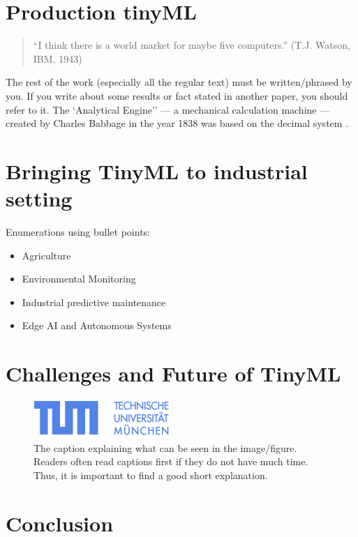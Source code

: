 \documentclass[twocolumn]{article}
\begin{document}
\section{Production tinyML}



\begin{quote}
	``I think there is a world market for maybe five computers.''
	(T.J. Watson, IBM, 1943)
\end{quote}

The rest of the work (especially all the regular text) must be
written/phrased by you. If you write about some results or fact
stated in another paper, you should refer to it.
The `Analytical Engine'' --- a mechanical calculation machine ---
created by Charles Babbage in the year 1838 was based on the decimal
system
\cite{hussein_original_2024, paul_rethinking_2021, de_prado_robustifying_2020,ren_synergy_2021,roshan_adaptive_2021}.


\section{Bringing TinyML to industrial setting}

Enumerations using bullet points:

\begin{itemize}
	\item 	Agriculture
	\item 	Environmental Monitoring
	\item 	Industrial predictive maintenance
	\item 	Edge AI and Autonomous Systems
\end{itemize}


\section{Challenges and Future of TinyML }


\begin{figure}
	\centerline{
	\includegraphics[width=0.9\columnwidth]{resource/TUM-Logo-102.png}
	}
	\caption{The caption explaining what can be seen in the image/figure.
	Readers often read captions first if they do not have much time. Thus,
	it is important to find a good short explanation.}
	\label{TUM}
	\end{figure}

\section{Conclusion}
\label{conclusion}



\nocite{hussein_original_2024,paul_rethinking_2021}




\end{document}
